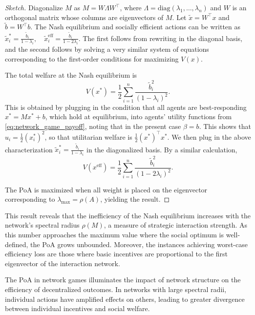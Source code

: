\documentclass{notices}
\theoremstyle{definition}\newtheorem{problem}{Problem}
\begin{document}
\begin{proof}[Sketch]

Diagonalize $M$ as $M = W \Lambda W^\top$, where $\Lambda = \text{diag}(\lambda_1, \ldots, \lambda_n)$ and $W$ is an orthogonal matrix whose columns are eigenvectors of $M$. Let $\tilde{x} = W^\top x$ and $\tilde{b} = W^\top b$. The Nash equilibrium and socially efficient actions can be written as
$
\tilde{x}_i^* = \frac{\tilde{b}_i}{1 -  \lambda_i}, \quad \tilde{x}_i^{\mathrm{eff}} = \frac{\tilde{b}_i}{1 - 2 \lambda_i}.
$ The first follows from rewriting  in the diagonal basis, and the second follows by solving a very similar system of equations corresponding to the first-order conditions for maximizing $V(x)$.

The total welfare at the Nash equilibrium is
\begin{equation}
V(x^*) = \frac{1}{2} \sum_{i=1}^n \frac{\tilde{b}_i^2}{(1 -  \lambda_i)^2}.  \end{equation} This is obtained by plugging in the condition that all agents are best-responding $x^*=Mx^* + b$, which hold at equilibrium, into agents' utility functions from \cref{eq:network_game_payoff}, noting that in the present case $\beta=b$. This shows that $u_i = \frac{1}{2}(x_i^*)^2$, so that utilitarian welfare is $\frac{1}{2} (x^*)^\top x^*$. We then plug in the above characterization $\tilde{x}_i^* = \frac{\tilde{b}_i}{1 -  \lambda_i}$ in the diagonalized basis. By a similar calculation,
\begin{equation}
V(x^{\mathrm{eff}}) = \frac{1}{2} \sum_{i=1}^n \frac{\tilde{b}_i^2}{(1 - 2 \lambda_i)^2}.
\end{equation}

The PoA is maximized when all weight is placed on the eigenvector corresponding to $\lambda_{\max} = \rho(A)$, yielding the result.
\end{proof}

This result reveals that the inefficiency of the Nash equilibrium increases with the network's spectral radius $\rho(M)$, a measure of strategic interaction strength. As this number approaches the maximum value where the social optimum is well-defined, the PoA grows unbounded. Moreover, the instances achieving worst-case efficiency loss are those where basic incentives are proportional to the first eigenvector of the interaction network.

The PoA in network games illuminates the impact of network structure on the efficiency of decentralized outcomes. In networks with large spectral radii, individual actions have amplified effects on others, leading to greater divergence between individual incentives and social welfare. 
\end{document}
